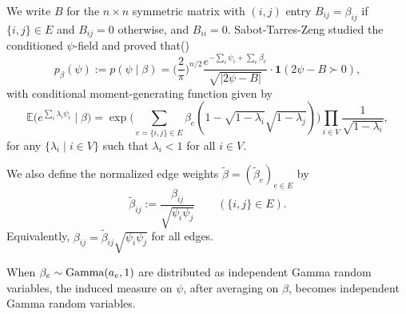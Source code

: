 \documentclass[a4paper, 11pt]{article}
\newcommand{\E}{\mathbb{E}}
\newcommand{\ind}{\mathbf{1}}
\newcommand{\gam}{\textnormal{Gamma}}
\begin{document}
We write $B$ for the $n\times n$ symmetric matrix with $(i,j)$ entry
$B_{ij}=\beta_{ij}$ if $\{i,j\}\in E$ and $B_{ij}=0$ otherwise, and $B_{ii}=0$. Sabot-Tarres-Zeng studied the conditioned $\psi$-field and proved that(\cite[Lemma 1]{stz})
\begin{equation}
    \label{eqn:p_beta_psi}
    p_\beta(\psi):=p(\psi\mid\beta)=\Big(\frac{2}{\pi}\Big)^{n/2}\frac{e^{-\sum_i \psi_i+\sum_e\beta_e}}{\sqrt{|2\psi-B|}}\cdot \ind(2\psi-B\succ 0),
\end{equation}
with conditional moment-generating function given by
\begin{equation}
    \label{eqn:p_beta_psi_mgf}
    \E\big(e^{\sum_i\lambda_i\psi_i}\mid \beta\big)
    = \exp\bigg(\sum_{e=\{i,j\}\in E}\beta_e(1-\sqrt{1-\lambda_i}\sqrt{1-\lambda_j})\bigg)\prod_{i\in V} \frac{1}{\sqrt{1-\lambda_i}},
\end{equation}
for any $\{\lambda_i\mid i\in V\}$ such that $\lambda_i<1$ for all $i\in V$.

We also define the normalized edge weights $\tilde\beta=(\tilde\beta_e)_{e\in E}$ by
\begin{equation}\label{eqn:tildebeta}
\tilde\beta_{ij}:=\frac{\beta_{ij}}{\sqrt{\psi_i\psi_j}}
\qquad (\{i,j\}\in E).
\end{equation}
Equivalently, $\beta_{ij}=\tilde\beta_{ij}\sqrt{\psi_i\psi_j}$ for all edges.

When $\beta_e\sim \gam(a_e,1)$ are distributed as independent Gamma random variables, the induced measure on $\psi$, after averaging on $\beta$, becomes independent Gamma random variables.
\end{document}
